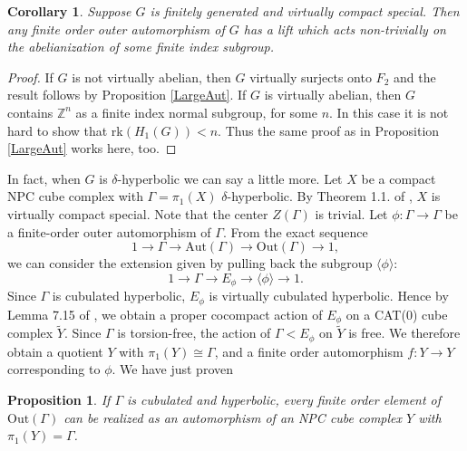 \documentclass[11pt]{amsart}
\numberwithin{thm}{section}
\newtheorem{proposition}[thm]{Proposition}
\newtheorem{corollary}[thm]{Corollary}
\theoremstyle{remark}
\theoremstyle{definition}
\newcommand{\Z}{\mathbb{Z}}
\newcommand{\Aut}{\text{Aut}}
\newcommand{\Out}{\text{Out}}
\newcommand{\til}{\widetilde}
\begin{document}
%
\begin{corollary}\label{Cover} Suppose $G$ is finitely generated and virtually compact special.  Then any finite order outer automorphism of $G$ has a lift which acts non-trivially on the abelianization of some finite index subgroup.  
\end{corollary}
\begin{proof} If $G$ is not virtually abelian, then $G$ virtually surjects onto $F_2$ and the result follows by Proposition \ref{LargeAut}.  If $G$ is virtually abelian, then $G$ contains $\Z^n$ as a finite index normal subgroup, for some $n$.  In this case it is not hard to show that rk$(H_1(G))<n$.  Thus the same proof as in Proposition \ref{LargeAut} works here, too.
\end{proof}

In fact, when $G$ is $\delta$-hyperbolic we can say a little more.  Let $X$ be a compact NPC cube complex with $\Gamma=\pi_1(X)$ $\delta$-hyperbolic.  By Theorem 1.1. of \cite{Ag13}, $X$ is virtually compact special.  Note that the center $Z(\Gamma)$ is trivial.
Let $\phi: \Gamma\rightarrow \Gamma$ be a finite-order outer automorphism of $\Gamma$.  From the exact sequence \[1\rightarrow \Gamma\rightarrow \Aut(\Gamma)\rightarrow \Out(\Gamma)\rightarrow 1,\]
we can consider the extension given by pulling back the subgroup $\langle \phi\rangle$: \[1\rightarrow \Gamma\rightarrow  E_\phi\rightarrow \langle\phi\rangle\rightarrow 1.\]
Since $\Gamma$ is cubulated hyperbolic, $E_\phi$ is virtually cubulated hyperbolic. Hence by Lemma 7.15 of \cite{Wise12},  we obtain a proper cocompact action of $E_\phi$ on a CAT(0) cube complex $\til{Y}$.  Since $\Gamma$ is torsion-free, the action of $\Gamma<E_\phi$ on $\til{Y}$ is free.  We therefore obtain a quotient $Y$ with $\pi_1(Y)\cong \Gamma$, and a finite order automorphism $f:Y\rightarrow Y$ corresponding to $\phi$.  We have just proven
\begin{proposition}If $\Gamma$ is cubulated and hyperbolic, every finite order element of $\Out(\Gamma)$ can be realized as an automorphism of an NPC cube complex $Y$ with $\pi_1(Y)=\Gamma$. 
\end{proposition}

\end{document}

